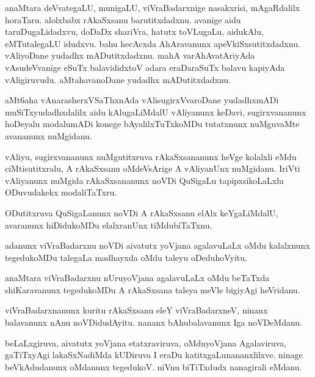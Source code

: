 \documentclass{article}
\begin{document}
\begin{mn}
anaMtara  deVvategaLU,  munigaLU,  viVraBadarxnige  nasakxrisi,  mAgaRdalilx  horaTaru.  alolxbabx  rAkaSxsanu  
barutitxdadxnu.  avanige  aidu  taruDugaLidadxvu,  doDaDx shariVra,  hatutx  toVLugaLu,  aidukAlu,  eMTutalegaLU  
idudxvu.  bahu  hecAcxda  AhAravanunx  apeVkiSxsutitxdadxnu.  vAliyoDane  yudadhx mADutitxdadxnu.  mahA 
varAhAvatAriyAda  vAsudeVvanige  eSuTx  balavididxtoV  adara  eraDaraSuTx  balavu  kapiyAda  vAligiruvudu.  
aMtahavanoDane  yudadhx mADutitxdadxnu.
\end{mn}

\begin{mn}
aMt6aha  vAnarasherxVSaThxnAda  vAlisugirxVvaroDane  yudadhxmADi  muSiTxyudadhxdalilx  aidu  kAlugaLiMdalU  vAliyanunx  
keDavi,  sugirxvananunx  hoDeyalu  modalumADi  konege  bAyalilxTuTxkoMDu  tutatxnunx  nuMguvaMte  avananunx  nuMgidanu.
\end{mn}

\begin{mn}
vAliyu,  sugirxvananunx  nuMgutitxruva  rAkaSxsananunx  heVge  kolalxli  eMdu  ciMtisutitxralu,  A  rAkaSxsanu  oMdeVsArige  A  
vAliyanUnx  nuMgidanu.  IriVti  vAliyanunx  nuMgida  rAkaSxsananunx  noVDi  QuSigaLu  tapipxsikoLaLxlu  ODuvudakekx  modaliTaTxru.
\end{mn}

\begin{mn}
ODutitxruva  QuSigaLanunx   noVDi  A  rAkaSxsanu  elAlx  keYgaLiMdalU,  avaranunx  hiDidukoMDu  elalxranUnx  tiMdubiTaTxnu.
\end{mn}

\begin{mn}
adanunx  viVraBadarxnu  noVDi  aivatutx yoVjana  agalavuLaLx  oMdu  kalalxnunx  tegedukoMDu  talegaLa  madhayxda  
oMdu  taleyu  oDeduhoVyitu.
\end{mn}

\begin{mn}
anaMtara  viVraBadarxnu  nUruyoVjana  agalavuLaLx  oMdu  beTaTxda  shiKaravanunx  tegedukoMDu  A  rAkaSxsana  
taleya  meVle  bigiyAgi  heVridanu.
\end{mn}

\begin{mn}
viVraBadarxnanunx  kuritu  rAkaSxsanu  eleY  viVraBadarxneV,  ninanx  balavanunx  nAnu  noVDidudAyitu.  nananx  
bAhubalavanunx  Iga  noVDeMdanu.
\end{mn}

\begin{mn}
beLaLxgiruva,  aivatutx yoVjana  etatxraviruva,  oMduyoVjana  Agalaviruva,  gaTiTxyAgi  lakaSxNadiMda  kUDiruva  
I  eraDu  katitxgaLunananxlilxve.  ninage  beVkAdudanunx  oMdanunx  tegedukoV.  niVnu  biTiTxdudx  nanagirali  eMdanu.  
\end{mn}
\end{document}
